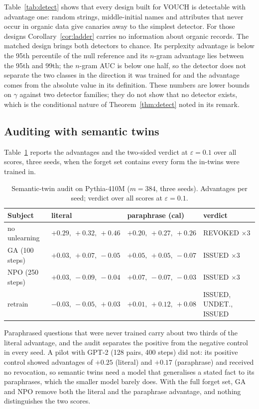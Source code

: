 \documentclass[11pt]{article}
\theoremstyle{definition}
\theoremstyle{remark}
\newcommand{\eps}{\varepsilon}
\begin{document}
Table~\ref{tab:detect} shows that every design built for VOUCH is detectable with
advantage one: random strings, middle-initial names and attributes that never occur
in organic data give canaries away to the simplest detector. For those designs
Corollary~\ref{cor:ladder} carries no information about organic records. The matched
design brings both detectors to chance. Its perplexity advantage is below the 95th
percentile of the null reference and its $n$-gram advantage lies between the 95th and
99th; the $n$-gram AUC is below one half, so the detector does not separate the two
classes in the direction it was trained for and the advantage comes from the absolute
value in its definition. These numbers are lower bounds on $\gamma$ against two
detector families; they do not show that no detector exists, which is the
conditional nature of Theorem~\ref{thm:detect} noted in its remark.

\subsection{Auditing with semantic twins}

Table~\ref{tab:semantic} reports the advantages and the two-sided verdict at
$\eps=0.1$ over all scores, three seeds, when the forget set contains every form the
in-twins were trained in.

\begin{table}[h]
\centering
\caption{Semantic-twin audit on Pythia-410M ($m=384$, three seeds). Advantages per
seed; verdict over all scores at $\eps=0.1$.}\label{tab:semantic}
\begin{tabular}{llll}
\toprule
Subject & literal & paraphrase (cal) & verdict \\
\midrule
no unlearning & $+0.29,\ +0.32,\ +0.46$ & $+0.20,\ +0.27,\ +0.26$ & REVOKED $\times3$ \\
GA (100 steps)  & $+0.03,\ +0.07,\ -0.05$ & $+0.05,\ +0.05,\ -0.07$ & ISSUED $\times3$ \\
NPO (250 steps) & $+0.03,\ -0.09,\ -0.04$ & $+0.07,\ -0.07,\ -0.03$ & ISSUED $\times3$ \\
retrain         & $-0.03,\ -0.05,\ +0.03$ & $+0.01,\ +0.12,\ +0.08$ & ISSUED, UNDET., ISSUED \\
\bottomrule
\end{tabular}
\end{table}

Paraphrased questions that were never trained carry about two thirds of the
literal advantage, and the audit separates the positive from the negative control in
every seed. A pilot with GPT-2 (128 pairs, 400 steps) did not: its positive control
showed advantages of $+0.25$ (literal) and $+0.17$ (paraphrase) and received no
revocation, so semantic twins need a model that generalises a stated fact to its
paraphrases, which the smaller model barely does. With the full forget set, GA and
NPO remove both the literal and the paraphrase advantage, and nothing distinguishes
the two scores.
\end{document}
